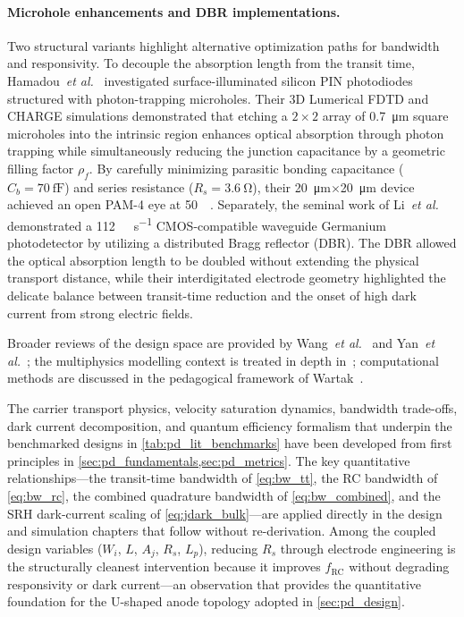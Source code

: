 \paragraph{Microhole enhancements and DBR implementations.}
Two structural variants highlight alternative optimization paths for bandwidth
and responsivity. To decouple the absorption length from the transit time,
Hamadou~\textit{et al.}~\cite{Hamadou2023} investigated surface-illuminated
silicon PIN photodiodes structured with photon-trapping microholes.
Their 3D Lumerical FDTD and CHARGE simulations demonstrated that etching a
$2\times2$ array of \SI{0.7}{\micro\metre} square microholes into the intrinsic
region enhances optical absorption through photon trapping while simultaneously
reducing the junction capacitance by a geometric filling factor $\rho_f$.
By carefully minimizing parasitic bonding capacitance ($C_b=\SI{70}{\femto\farad}$)
and series resistance ($R_s=\SI{3.6}{\ohm}$), their
\SI{20}{\micro\metre}$\times$\SI{20}{\micro\metre} device
achieved an open PAM-4 eye at \SI{50}{\giga\baud}.
Separately, the seminal work of Li~\textit{et al.}~\cite{Li2012} demonstrated
a \SI{112}{\giga\bit\per\second} CMOS-compatible waveguide Germanium photodetector
by utilizing a distributed Bragg reflector (DBR). The DBR allowed the optical
absorption length to be doubled without extending the physical transport distance,
while their interdigitated electrode geometry highlighted the delicate balance
between transit-time reduction and the onset of high dark current from strong
electric fields.

Broader reviews of the design space are provided by Wang~\textit{et al.}~\cite{Wang2024}
and Yan~\textit{et al.}~\cite{Yan2024}; the multiphysics modelling context is
treated in depth in~\cite{Alasio2024}; computational methods are discussed in
the pedagogical framework of Wartak~\cite{Wartak2013}.


The carrier transport physics, velocity saturation dynamics, bandwidth
trade-offs, dark current decomposition, and quantum efficiency formalism
that underpin the benchmarked designs in \cref{tab:pd_lit_benchmarks}
have been developed from first principles in
\cref{sec:pd_fundamentals,sec:pd_metrics}. The key quantitative
relationships---the transit-time bandwidth of \cref{eq:bw_tt}, the RC
bandwidth of \cref{eq:bw_rc}, the combined quadrature bandwidth of
\cref{eq:bw_combined}, and the SRH dark-current scaling of
\cref{eq:jdark_bulk}---are applied directly in the design and simulation
chapters that follow without re-derivation. Among the coupled design
variables ($W_i$, $L$, $A_j$, $R_s$, $L_p$), reducing $R_s$
through electrode engineering is the structurally cleanest intervention
because it improves $f_{\mathrm{RC}}$ without degrading responsivity or
dark current---an observation that provides the quantitative foundation
for the U-shaped anode topology adopted in \cref{sec:pd_design}.